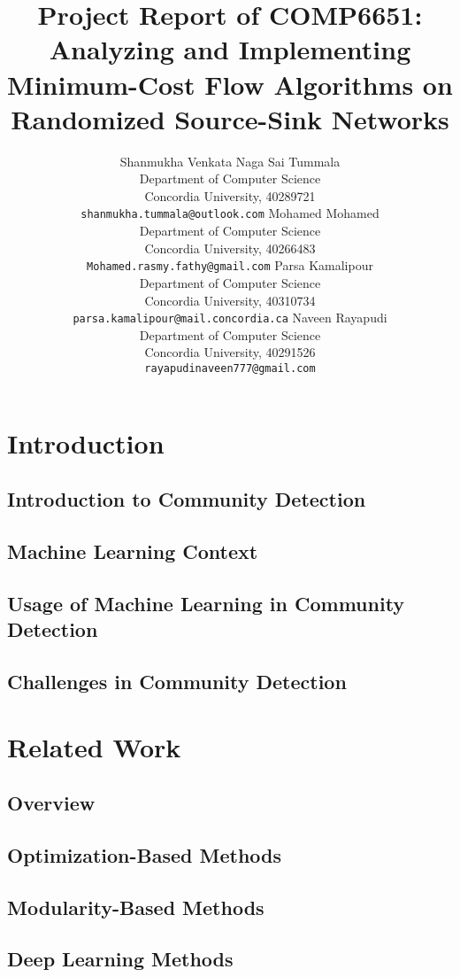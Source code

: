\documentclass{article}
\title{Project Report of COMP6651: Analyzing and Implementing Minimum-Cost Flow Algorithms on Randomized Source-Sink Networks
}
\author{%
	Shanmukha Venkata Naga Sai Tummala\\
  Department of Computer Science \\
  Concordia University, 40289721 \\
  \texttt{shanmukha.tummala@outlook.com} 
  \And
	Mohamed Mohamed\\
  Department of Computer Science \\
  Concordia University, 40266483 \\
  \texttt{Mohamed.rasmy.fathy@gmail.com} 
  \And
  Parsa Kamalipour\\
  Department of Computer Science \\
  Concordia University, 40310734 \\
  \texttt{parsa.kamalipour@mail.concordia.ca} 
  \And
  Naveen Rayapudi \\
  Department of Computer Science \\
  Concordia University, 40291526 \\
  \texttt{rayapudinaveen777@gmail.com} 
}
\begin{document}
\maketitle

\begin{abstract}


\end{abstract}

\section{Introduction}
\subsection{Introduction to Community Detection}


\subsection{Machine Learning Context}


\subsection{Usage of Machine Learning in Community Detection}


\subsection{Challenges in Community Detection}

\section{Related Work}
\subsection{Overview}

\subsection{Optimization-Based Methods}


\subsection{Modularity-Based Methods}


\subsection{Deep Learning Methods}
\end{document}
